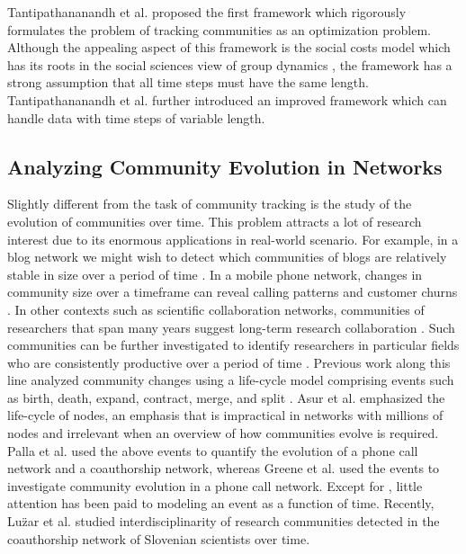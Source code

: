 Tantipathananandh et al. \cite{Tantipathananandh:2007} proposed the first framework which rigorously formulates the problem of tracking
communities as an optimization
problem. Although the appealing aspect of this framework is the social costs model which
has its roots in the
social sciences view of group dynamics \cite{Pearson_drif}, the framework has a strong assumption that all time steps must have the same
length. Tantipathananandh et al. \cite{Tantipathananandh:2009} further introduced an improved framework which can handle data with time
steps
of variable length. 

\subsection{Analyzing Community Evolution in Networks}
Slightly different from the task of community tracking is the study of the evolution of communities over time. This problem
attracts a lot of
research interest due to its enormous applications in real-world scenario. For example, in a blog network we might wish to detect which
communities of blogs are relatively stable in size over a period of time \cite{Lin:2008}. In a mobile phone network, changes in community
size over a timeframe can reveal calling patterns and customer churns \cite{5562773,citeulike:1206611}. In other contexts such as scientific
collaboration networks, communities of researchers that span many years suggest long-term research collaboration \cite{citeulike:1206611}.
Such communities can be further investigated to identify researchers in particular fields who are consistently productive over a period of
time \cite{Lin:2008}. Previous work along this line analyzed community changes using a life-cycle model comprising events such as birth,
death, expand, contract, merge, and split \cite{5562773,citeulike:1206611}. Asur et al. \cite{Asur:2009} emphasized the life-cycle of nodes,
an emphasis that is impractical in networks with millions of nodes and
irrelevant when an overview of how communities evolve is required. Palla et al. \cite{citeulike:1206611} used the above events to quantify
the evolution of a phone call network and a coauthorship network, whereas Greene et al. \cite{5562773} used the events to investigate
community evolution in a phone call network. Except for \cite{citeulike:1206611}, little attention has been paid to modeling an event as a
function of time. Recently,  Lu\"{z}ar et al. \cite{Povh} studied interdisciplinarity of research communities detected in the coauthorship
network of Slovenian scientists over time.

